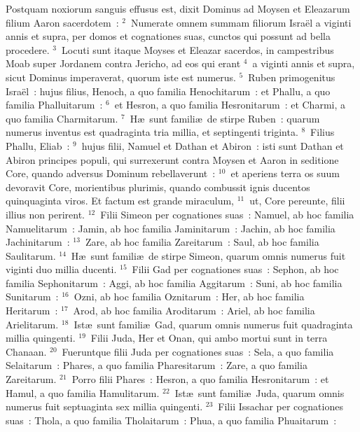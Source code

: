 \lettrine[lines=3,image=true,loversize=0.05,lraise=-0.03]{P}{}ostquam noxiorum sanguis effusus est, dixit Dominus ad Moysen et Eleazarum filium Aaron sacerdotem~:
${}^{2}$~Numerate omnem summam filiorum Isra\"el a viginti annis et supra, per domos et cognationes suas, cunctos qui possunt ad bella procedere.
${}^{3}$~Locuti sunt itaque Moyses et Eleazar sacerdos, in campestribus Moab super Jordanem contra Jericho, ad eos qui erant
${}^{4}$~a viginti annis et supra, sicut Dominus imperaverat, quorum iste est numerus.
${}^{5}$~Ruben primogenitus Isra\"el~: hujus filius, Henoch, a quo familia Henochitarum~: et Phallu, a quo familia Phalluitarum~:
${}^{6}$~et Hesron, a quo familia Hesronitarum~: et Charmi, a quo familia Charmitarum.
${}^{7}$~H\ae\ sunt famili\ae\ de stirpe Ruben~: quarum numerus inventus est quadraginta tria millia, et septingenti triginta.
${}^{8}$~Filius Phallu, Eliab~:
${}^{9}$~hujus filii, Namuel et Dathan et Abiron~: isti sunt Dathan et Abiron principes populi, qui surrexerunt contra Moysen et Aaron in seditione Core, quando adversus Dominum rebellaverunt~:
${}^{10}$~et aperiens terra os suum devoravit Core, morientibus plurimis, quando combussit ignis ducentos quinquaginta viros. Et factum est grande miraculum,
${}^{11}$~ut, Core pereunte, filii illius non perirent.
${}^{12}$~Filii Simeon per cognationes suas~: Namuel, ab hoc familia Namuelitarum~: Jamin, ab hoc familia Jaminitarum~: Jachin, ab hoc familia Jachinitarum~:
${}^{13}$~Zare, ab hoc familia Zareitarum~: Saul, ab hoc familia Saulitarum.
${}^{14}$~H\ae\ sunt famili\ae\ de stirpe Simeon, quarum omnis numerus fuit viginti duo millia ducenti.
${}^{15}$~Filii Gad per cognationes suas~: Sephon, ab hoc familia Sephonitarum~: Aggi, ab hoc familia Aggitarum~: Suni, ab hoc familia Sunitarum~:
${}^{16}$~Ozni, ab hoc familia Oznitarum~: Her, ab hoc familia Heritarum~:
${}^{17}$~Arod, ab hoc familia Aroditarum~: Ariel, ab hoc familia Arielitarum.
${}^{18}$~Ist\ae\ sunt famili\ae\ Gad, quarum omnis numerus fuit quadraginta millia quingenti.
${}^{19}$~Filii Juda, Her et Onan, qui ambo mortui sunt in terra Chanaan.
${}^{20}$~Fueruntque filii Juda per cognationes suas~: Sela, a quo familia Selaitarum~: Phares, a quo familia Pharesitarum~: Zare, a quo familia Zareitarum.
${}^{21}$~Porro filii Phares~: Hesron, a quo familia Hesronitarum~: et Hamul, a quo familia Hamulitarum.
${}^{22}$~Ist\ae\ sunt famili\ae\ Juda, quarum omnis numerus fuit septuaginta sex millia quingenti.
${}^{23}$~Filii Issachar per cognationes suas~: Thola, a quo familia Tholaitarum~: Phua, a quo familia Phuaitarum~:
